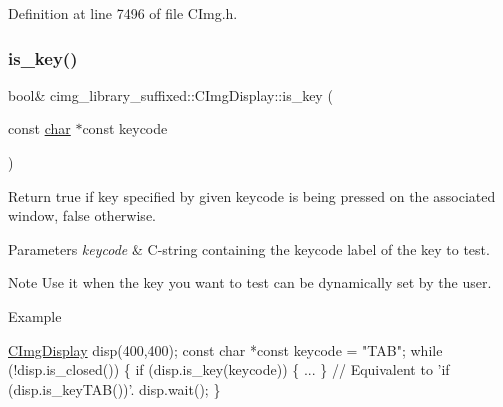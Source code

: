 Definition at line 7496 of file C\+Img.\+h.

\mbox{\label{structcimg__library__suffixed_1_1CImgDisplay_a48961073143fda753d2ebf18aa697319}} 
\subsubsection{\texorpdfstring{is\+\_\+key()}{is\_key()}\hspace{0.1cm}{\footnotesize\ttfamily [3/3]}}
{\footnotesize\ttfamily bool\& cimg\+\_\+library\+\_\+suffixed\+::\+C\+Img\+Display\+::is\+\_\+key (\begin{DoxyParamCaption}\item[{const \hyperlink{classchar}{char} $\ast$const}]{keycode }\end{DoxyParamCaption})\hspace{0.3cm}{\ttfamily [inline]}}



Return {\ttfamily true} if key specified by given keycode is being pressed on the associated window, {\ttfamily false} otherwise. 


\begin{DoxyParams}{Parameters}
{\em keycode} & C-\/string containing the keycode label of the key to test. \\
\hline
\end{DoxyParams}
\begin{DoxyNote}{Note}
Use it when the key you want to test can be dynamically set by the user. 
\end{DoxyNote}
\begin{DoxyParagraph}{Example}

\begin{DoxyCode}
\hyperlink{structcimg__library__suffixed_1_1CImgDisplay_a7716ca9a49ff94123b3417556bf4ce49}{CImgDisplay} disp(400,400);
\textcolor{keyword}{const} \textcolor{keywordtype}{char} *\textcolor{keyword}{const} keycode = \textcolor{stringliteral}{"TAB"};
\textcolor{keywordflow}{while} (!disp.is\_closed()) \{
  \textcolor{keywordflow}{if} (disp.is\_key(keycode)) \{ ... \}  \textcolor{comment}{// Equivalent to 'if (disp.is\_keyTAB())'.}
  disp.wait();
\}
\end{DoxyCode}
 
\end{DoxyParagraph}


